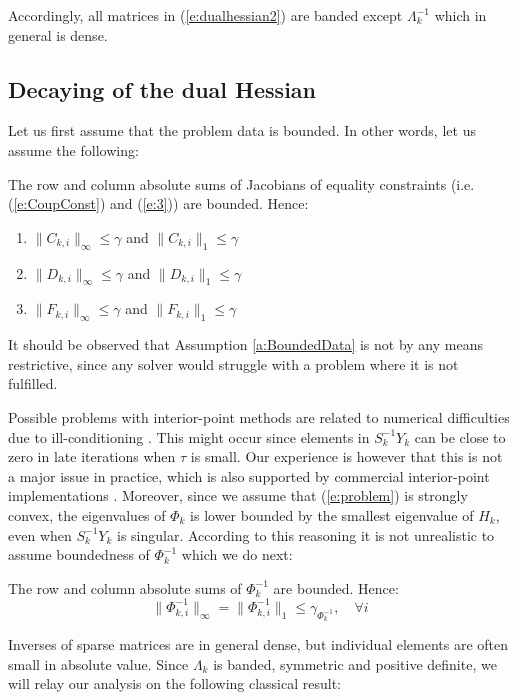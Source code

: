 Accordingly, all matrices in (\ref{e:dualhessian2}) are banded except $\Lambda_k^{-1}$ which in general is dense.

\subsection{Decaying of the dual Hessian} \label{S:TheoreticalDecay}
Let us first assume that the problem data is bounded. In other words, let us assume the following:
\begin{assumption} \label{a:BoundedData}
The row and column absolute sums of Jacobians of equality constraints (i.e. (\ref{e:CoupConst}) and (\ref{e:3})) are bounded. Hence:
\begin{enumerate}
\item $\| C_{k,i} \|_\infty \leq \gamma$ and $\| C_{k,i} \|_1 \leq \gamma$
\item $\| D_{k,i} \|_\infty \leq \gamma$ and $\| D_{k,i} \|_1 \leq \gamma$
\item $\| F_{k,i} \|_\infty \leq \gamma$ and $\| F_{k,i} \|_1 \leq \gamma$
\end{enumerate}
\end{assumption}
It should be observed that Assumption \ref{a:BoundedData} is not by any means restrictive, since any solver would struggle with a problem where it is not fulfilled. 

Possible problems with interior-point methods are related to numerical difficulties due to ill-conditioning \cite{}. This might occur since elements in $S_k^{-1}Y_k$ can be close to zero in late iterations when $\tau$ is small. Our experience is however that this is not a major issue in practice, which is also supported by commercial interior-point implementations \cite{}. Moreover, since we assume that (\ref{e:problem}) is strongly convex, the eigenvalues of $\Phi_k$ is lower bounded by the smallest eigenvalue of $H_k$, even when $S_k^{-1}Y_k$ is singular. According to this reasoning it is not unrealistic to assume boundedness of $\Phi_k^{-1}$ which we do next:
\begin{assumption} \label{a:BoundedConditioning}
The row and column absolute sums of $\Phi_k^{-1}$ are bounded. Hence:
\begin{equation}
\| \Phi_{k,i}^{-1} \|_\infty = \| \Phi_{k,i}^{-1} \|_1 \leq \gamma_{\Phi_k^{-1}}, \quad \forall i
\end{equation}
\end{assumption}

Inverses of sparse matrices are in general dense, but individual elements are often small in absolute value. Since $\Lambda_k$ is banded, symmetric and positive definite, we will relay our analysis on the following classical result:


